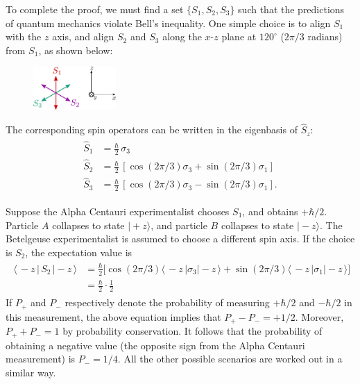 \documentclass[pra,12pt]{revtex4}
\begin{document}
To complete the proof, we must find a set $\{S_1, S_2, S_3\}$ such
that the predictions of quantum mechanics violate Bell's inequality.
One simple choice is to align $S_1$ with the $z$ axis, and align $S_2$
and $S_3$ along the $x$-$z$ plane at $120^\circ$ ($2\pi/3$ radians)
from $S_1$, as shown below:

\begin{figure}[h]
  \centering\includegraphics[width=0.28\textwidth]{bellaxes}
\end{figure}

The corresponding spin operators can be written in the eigenbasis of
$\hat{S}_z$:
\begin{align}
  \begin{aligned}\hat{S}_1 &= \frac{\hbar}{2} \, \sigma_3 \\ \hat{S}_2 &= \frac{\hbar}{2} \, \left[\cos(2\pi/3) \sigma_3 + \sin(2\pi/3)\sigma_1\right]  \\   \hat{S}_3 &= \frac{\hbar}{2} \, \left[\cos(2\pi/3) \sigma_3 - \sin(2\pi/3)\sigma_1\right].\end{aligned}
\end{align}

Suppose the Alpha Centauri experimentalist chooses $S_1$, and obtains
$+\hbar/2$.  Particle $A$ collapses to state $|\!+\!z\rangle$, and
particle $B$ collapses to state $|\!-\!z\rangle$.  The Betelgeuse
experimentalist is assumed to choose a different spin axis.  If the
choice is $S_2$, the expectation value is
\begin{align}
  \begin{aligned}\langle\, - z \, | \, S_2 \,|-\!z\,\rangle &= \frac{\hbar}{2} \Big[\cos(2\pi/3) \langle\,- z\,|\sigma_3| - \!z\,\rangle + \sin(2\pi/3)\langle\,- z\,|\sigma_1|-\!z\,\rangle\Big]\\ &= \frac{\hbar}{2} \cdot \frac{1}{2} \end{aligned}
\end{align}
If $P_+$ and $P_-$ respectively denote the probability of measuring
$+\hbar/2$ and $-\hbar/2$ in this measurement, the above equation
implies that $P_+ - P_- = + 1/2$.  Moreover, $P_+ + P_- = 1$ by
probability conservation.  It follows that the probability of
obtaining a negative value (the opposite sign from the Alpha Centauri
measurement) is $P_- = 1/4$.  All the other possible scenarios are
worked out in a similar way.
\end{document}
